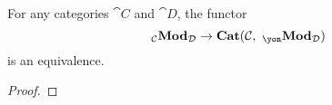 \documentclass[Book-Poly]{subfiles}
\begin{document}
\begin{theorem} \label{thm.pra_tensored_cat}
For any categories $\cat{C}$ and $\cat{D}$, the functor 
\[
    \bimod{\cat{C}}{\cat{D}} \to \smcat(\cat{C}, \bimod{\yon}{\cat{D}})
\]
is an equivalence.
\end{theorem}
\begin{proof}

\end{proof}
\end{document}
